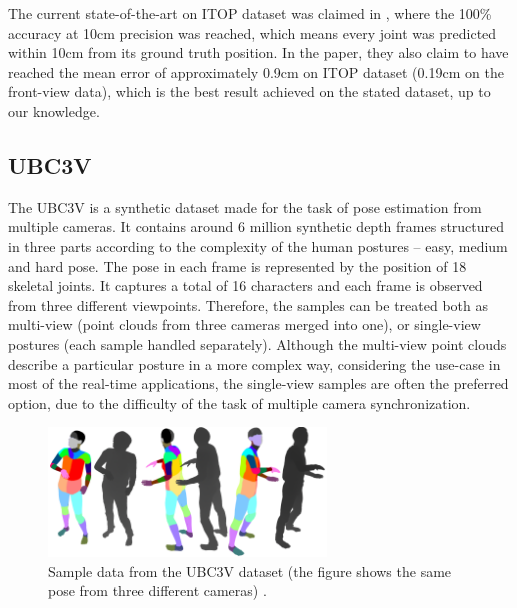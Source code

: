 \noindent
The current state-of-the-art on ITOP dataset was claimed in \cite{Marin18jvcir}, where the 100\% accuracy at 10cm precision was reached, which means every joint was predicted within 10cm from its ground truth position. In the paper, they also claim to have reached the mean error of approximately 0.9cm on ITOP dataset (0.19cm on the front-view data), which is the best result achieved on the stated dataset, up to our knowledge.

\subsection{UBC3V}

The UBC3V \cite{Shafaei16} is a synthetic dataset made for the task of pose estimation from multiple cameras. It contains around 6 million synthetic depth frames structured in three parts according to the complexity of the human postures – easy, medium and hard pose. The pose in each frame is represented by the position of 18 skeletal joints. It captures a total of 16 characters and each frame is observed from three different viewpoints. Therefore, the samples can be treated both as multi-view (point clouds from three cameras merged into one), or single-view postures (each sample handled separately). Although the multi-view point clouds describe a particular posture in a more complex way, considering the use-case in most of the real-time applications, the single-view samples are often the preferred option, due to the difficulty of the task of multiple camera synchronization.\par

\vspace{5mm}
\begin{figure}[H]
\begin{center}
  \includegraphics[height=130px]{images/implementation/ubc3v.png}
  \caption[Sample data from the UBC3V dataset \cite{Shafaei16}.]{Sample data from the UBC3V dataset (the figure shows the same pose from three different cameras) \cite{Shafaei16}.}
  \label{fig:ubc3v}
\end{center}
\end{figure}

